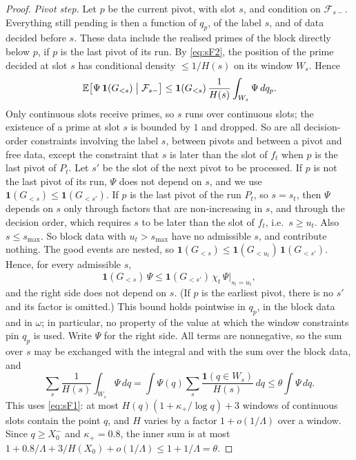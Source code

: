 \begin{proof}
\emph{Pivot step.} Let $p$ be the current pivot, with slot $s$, and condition on $\mathcal F_{s-}$. Everything still
pending is then a function of $q_p$, of the label $s$, and of data decided before $s$. These data include the realised
primes of the block directly below $p$, if $p$ is the last pivot of its run. By \ref{eq:sF2}, the position of the prime
decided at slot $s$ has conditional density $\le1/H(s)$ on its window $W_s$. Hence
\[
  \mathbb{E}\bigl[\Psi\,\mathbf 1(G_{<s})\bigm|\mathcal F_{s-}\bigr]\le\mathbf 1(G_{<s})\,\frac1{H(s)}\int_{W_s}\Psi\,dq_p .
\]
Only continuous slots receive primes, so $s$ runs over continuous slots; the existence of a prime at slot $s$ is
bounded by $1$ and dropped. So are all decision-order constraints involving
the label $s$, between pivots and between a pivot and free data, except the constraint that $s$ is later than the slot
of $f_t$ when $p$ is the last pivot of $P_t$. Let $s'$ be the slot of the next pivot to be processed. If $p$ is not the last pivot of its run, $\Psi$ does not
depend on $s$, and we use $\mathbf 1(G_{<s})\le\mathbf 1(G_{<s'})$. If $p$ is the last pivot of the run $P_t$, so
$s=s_t$, then $\Psi$ depends on $s$ only through factors that are non-increasing in $s$, and through the decision order,
which requires $s$ to be later than the slot of $f_t$, i.e.\ $s\ge u_t$. Also $s\le s_{\max}$. So block data with
$u_t>s_{\max}$ have no admissible $s$, and contribute nothing. The good events are nested, so
$\mathbf 1(G_{<s})\le\mathbf 1(G_{<u_t})\,\mathbf 1(G_{<s'})$. Hence, for every admissible $s$,
\[
  \mathbf 1(G_{<s})\,\Psi\le\mathbf 1(G_{<s'})\,\chi_t\,\Psi|_{s_t=u_t},
\]
and the right side does not depend on $s$. (If $p$ is the earliest pivot, there is no $s'$ and its factor is omitted.)
This bound holds pointwise in $q_p$, in the block data and in $\omega$; in particular, no property of the value at which
the window constraints pin $q_p$ is used. Write $\Psi$ for the right side. All terms are nonnegative, so the sum over $s$
may be exchanged with the integral and with the sum over the block data, and
\[
  \sum_s\frac1{H(s)}\int_{W_s}\Psi\,dq=\int\Psi(q)\sum_s\frac{\mathbf 1(q\in W_s)}{H(s)}\,dq\le\theta\int\Psi\,dq .
\]
This uses \ref{eq:sF1}: at most $H(q)(1+\kappa_+/\log q)+3$ windows of continuous slots contain the point $q$, and $H$
varies by a factor
$1+o(1/\Lambda)$ over a window. Since $q\ge X_0^-$ and $\kappa_+=0.8$, the inner sum is at most
$1+0.8/\Lambda+3/H(X_0)+o(1/\Lambda)\le1+1/\Lambda=\theta$.


\end{proof}
